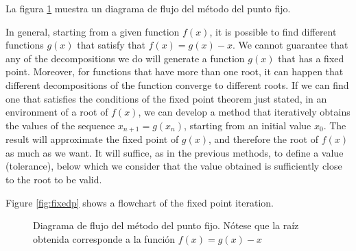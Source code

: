 \begin{paracol}{2}
La figura \ref{fig:pfijo1} muestra un diagrama de flujo del método del punto fijo. 

\switchcolumn

In general, starting from a given function $f(x)$, it is possible to find different functions $g(x)$ that satisfy that $f(x)=g(x)-x$. We cannot guarantee that any of the decompositions we do will generate a function $g(x)$ that has a fixed point. 
Moreover, for functions that have more than one root, it can happen that different decompositions of the function converge to different roots.
If we can find one that satisfies the conditions of the fixed point theorem just stated, in an environment of a root of $f(x)$, we can develop a method that iteratively obtains the values of the sequence $x_{n+1}=g(x_n)$, starting from an initial value $x_0$. The result will approximate the fixed point of $g(x)$, and therefore the root of $f(x)$ as much as we want. It will suffice, as in the previous methods, to define a value (tolerance), below which we consider that the value obtained is sufficiently close to the root to be valid.

Figure \ref{fig:fixedp} shows a flowchart of the fixed point iteration. 


\switchcolumn

\begin{figure}[h]
\centering
{}
\caption{Diagrama de flujo del método del punto fijo. Nótese que la raíz obtenida corresponde a la función $f(x)=g(x)-x$}
\label{fig:pfijo1}
\end{figure}


\end{paracol}
